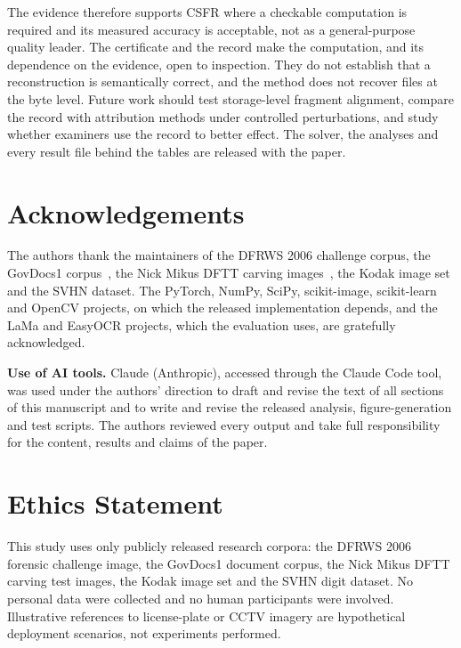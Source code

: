 \documentclass[final,3p]{elsarticle}
\newif\ifanonymous
\begin{document}
The evidence therefore supports CSFR where a checkable computation is required and its measured accuracy is acceptable, not as a general-purpose quality leader. The certificate and the record make the computation, and its dependence on the evidence, open to inspection. They do not establish that a reconstruction is semantically correct, and the method does not recover files at the byte level. Future work should test storage-level fragment alignment, compare the record with attribution methods under controlled perturbations, and study whether examiners use the record to better effect. The solver, the analyses and every result file behind the tables are released with the paper.

\section*{Acknowledgements}
\ifanonymous\else
The authors thank the maintainers of the DFRWS 2006 challenge corpus, the GovDocs1 corpus~\cite{garfinkel2009bringing}, the Nick Mikus DFTT carving images~\cite{mikus2005evaluation}, the Kodak image set and the SVHN dataset. The PyTorch, NumPy, SciPy, scikit-image, scikit-learn and OpenCV projects, on which the released implementation depends, and the LaMa and EasyOCR projects, which the evaluation uses, are gratefully acknowledged.

\fi
\textbf{Use of AI tools.} Claude (Anthropic), accessed through the Claude Code tool, was used under the authors' direction to draft and revise the text of all sections of this manuscript and to write and revise the released analysis, figure-generation and test scripts. The authors reviewed every output and take full responsibility for the content, results and claims of the paper.

\section*{Ethics Statement}
This study uses only publicly released research corpora: the DFRWS 2006 forensic challenge image, the GovDocs1 document corpus, the Nick Mikus DFTT carving test images, the Kodak image set and the SVHN digit dataset. No personal data were collected and no human participants were involved. Illustrative references to license-plate or CCTV imagery are hypothetical deployment scenarios, not experiments performed.
\end{document}
